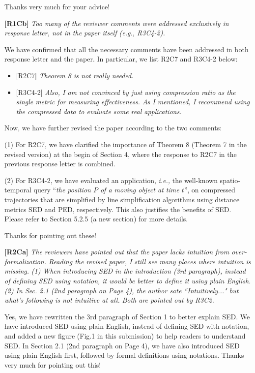 \documentclass{letter}
\newcommand{\ie}{\emph{i.e.,}\xspace}
\begin{document}
Thanks very much for your advice!


\textbf{[R1Cb]} \emph{Too many of the reviewer comments were addressed exclusively in response letter, not in the paper itself (e.g., {R3C4-2}).}

We have confirmed that all the necessary comments have been addressed in both response letter and the paper. In particular, we list R2C7 and R3C4-2 below:
\begin{itemize}

  \item {{[R2C7]} \emph{Theorem 8 is not really needed.}}

  \item {{[R3C4-2]} \emph{Also, I am not convinced by just using compression ratio as the single metric for measuring effectiveness. As I mentioned, I recommend using the compressed data to evaluate some real applications.}
}
\end{itemize}

Now, we have further revised the paper according to the two comments:

(1) For {R2C7}, we have clarified the importance of Theorem 8 (Theorem 7 in the revised version) at the begin of Section 4, where the response to R2C7 in the previous response letter is combined.

(2) For {R3C4-2}, we have evaluated an application, \ie the well-known spatio-temporal query ``\emph{the position $P$ of a moving object at time $t$}'', on compressed trajectories that are simplified by line simplification algorithms using distance metrics SED and PED, respectively. This also justifies the benefits of SED. Please refer to Section 5.2.5 (a new section) for more details.

Thanks for pointing out these!



\textbf{[R2Ca]} \emph{The reviewers have pointed out that the paper lacks intuition from over-formalization. Reading the revised paper, I still see many places where intuition is missing.}
\emph{(1) When introducing SED in the introduction (3rd paragraph), instead of defining SED using notation, it would be better to define it using plain English.}
\emph{(2) In Sec. 2.1 (2nd paragraph on Page 4), the author sate ``Intuitively..." but what's following is not intuitive at all.}
\emph{Both are pointed out by {R3C2}.}

Yes, we have rewritten the 3rd paragraph of Section 1 to better explain SED. We have introduced SED using plain English, instead of defining SED with notation, and added a new figure (Fig.1 in this submission) to help readers to understand SED.
{In Section 2.1 (2nd paragraph on Page 4), we have also introduced SED using plain English first, followed by formal definitions using notations.}
Thanks very much for pointing out this!
\end{document}
